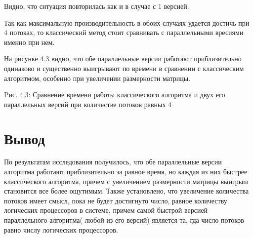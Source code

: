 \documentclass[12pt]{report}
\begin{document}
 Видно, что ситуация повторилась как и в случае с 1 версией.
 
 Так как максимальную производительность в обоих случаях удается достичь при 4 потоках, то классический метод стоит сравнивать с параллельными вресиями именно при нем.
 
 На рисунке 4.3 видно, что обе параллельные версии работают приблизительно одинаково и существенно выигрывают по времени в сравнении с классическим алгоритмом, особенно при увеличении размерности матрицы.
 
 \begin{center}
 	Pис. 4.3: Сравнение времени работы классического алгоритма и двух его параллельных версий при количестве потоков равных 4
 \end{center}
 
 
 \section*{Вывод}
 \qquad По результатам исследования получилось, что обе параллельные версии алгоритма работают приблизительно за равное время, но каждая из них быстрее классического алгоритма, причем с увеличением размерности матрицы выигрыш становится все более ощутимым. Также установлено, что увеличение количества потоков имеет смысл, пока не будет достигнуто число, равное количеству логических процессоров в системе, причем самой быстрой версией параллельного алгоритма( любой из его версий) является та, гда число потоков равно числу логических процессоров.

\newpage
\end{document}
